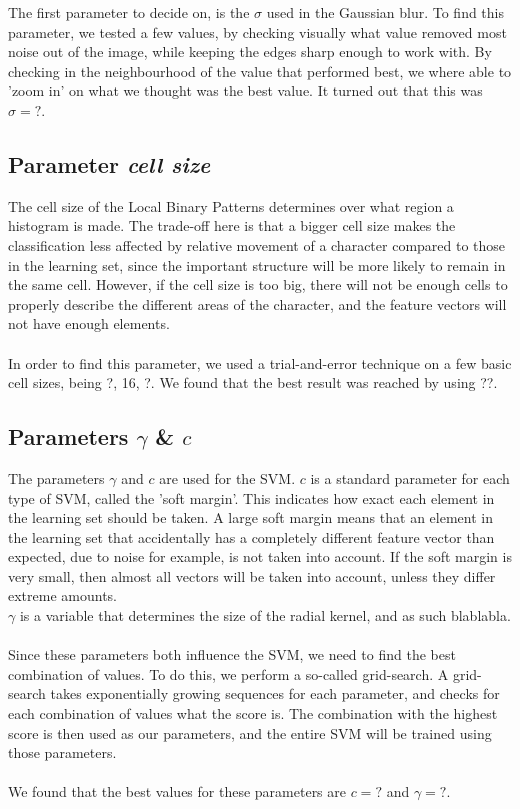 \documentclass[a4paper]{article}
\begin{document}
The first parameter to decide on, is the $\sigma$ used in the Gaussian blur. To
find this parameter, we tested a few values, by checking visually what value
removed most noise out of the image, while keeping the edges sharp enough to
work with. By checking in the neighbourhood of the value that performed best,
we where able to 'zoom in' on what we thought was the best value. It turned out
that this was $\sigma = ?$.

\subsection{Parameter \emph{cell size}}

The cell size of the Local Binary Patterns determines over what region a
histogram is made. The trade-off here is that a bigger cell size makes the
classification less affected by relative movement of a character compared to
those in the learning set, since the important structure will be more likely to
remain in the same cell. However, if the cell size is too big, there will not
be enough cells to properly describe the different areas of the character, and
the feature vectors will not have enough elements.\\
\\
In order to find this parameter, we used a trial-and-error technique on a few
basic cell sizes, being ?, 16, ?. We found that the best result was reached by
using ??.

\subsection{Parameters $\gamma$ \& $c$}

The parameters $\gamma$ and $c$ are used for the SVM. $c$ is a standard
parameter for each type of SVM, called the 'soft margin'. This indicates how
exact each element in the learning set should be taken. A large soft margin
means that an element in the learning set that accidentally has a completely
different feature vector than expected, due to noise for example, is not taken
into account. If the soft margin is very small, then almost all vectors will be
taken into account, unless they differ extreme amounts.\\
$\gamma$ is a variable that determines the size of the radial kernel, and as
such blablabla.\\
\\
Since these parameters both influence the SVM, we need to find the best
combination of values. To do this, we perform a so-called grid-search. A
grid-search takes exponentially growing sequences for each parameter, and
checks for each combination of values what the score is. The combination with
the highest score is then used as our parameters, and the entire SVM will be
trained using those parameters.\\
\\
We found that the best values for these parameters are $c=?$ and $\gamma =?$.
\end{document}
